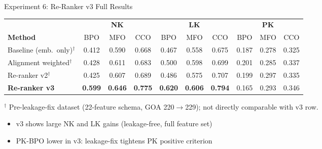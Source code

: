 \documentclass[12pt, aspectratio=169]{beamer}
\begin{document}
\begin{frame}{Experiment 6: Re-Ranker v3 Full Results}
  \begin{center}
    \begin{tabular}{l ccc ccc ccc}
      \toprule
      & \multicolumn{3}{c}{\textbf{NK}} & \multicolumn{3}{c}{\textbf{LK}} & \multicolumn{3}{c}{\textbf{PK}} \\
      \cmidrule(lr){2-4} \cmidrule(lr){5-7} \cmidrule(lr){8-10}
      \textbf{Method} & BPO & MFO & CCO & BPO & MFO & CCO & BPO & MFO & CCO \\
      \midrule
      Baseline (emb.~only)$^\dagger$ & 0.412 & 0.590 & 0.668 & 0.467 & 0.558 & 0.675 & 0.187 & 0.278 & 0.325 \\
      Alignment weighted$^\dagger$    & 0.428 & 0.611 & 0.683 & 0.500 & 0.598 & 0.699 & 0.201 & 0.285 & 0.337 \\
      Re-ranker v2$^\dagger$          & 0.425 & 0.607 & 0.689 & 0.486 & 0.575 & 0.707 & 0.199 & 0.297 & 0.335 \\
      \rowcolor{proteagreen!15}
      \textbf{Re-ranker v3} & \textbf{0.599} & \textbf{0.646} & \textbf{0.775} & \textbf{0.620} & \textbf{0.606} & \textbf{0.794} & 0.165 & 0.293 & 0.346 \\
      \bottomrule
    \end{tabular}
  \end{center}
  \vspace{0.3em}
  {\small $^\dagger$ Pre-leakage-fix dataset (22-feature schema, GOA 220$\to$229); not directly comparable with v3 row.}
  \vspace{0.3em}
  \begin{itemize}
    \item v3 shows large NK and LK gains (leakage-free, full feature set)
    \item PK-BPO lower in v3: leakage-fix tightens PK positive criterion
  \end{itemize}
\end{frame}
\end{document}
